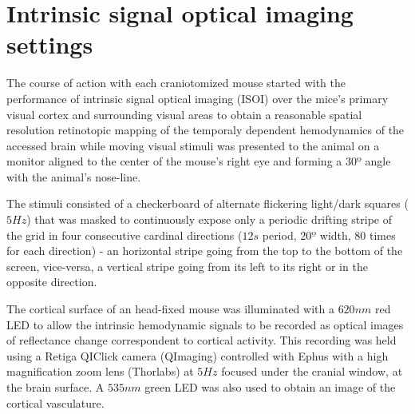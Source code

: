 \section{Intrinsic signal optical imaging settings}
\label{sec:Intrinsic-signal-optical-imaging-settings}

The course of action with each craniotomized mouse started with the performance of intrinsic signal optical imaging (ISOI) over the mice's primary visual cortex and surrounding visual areas to obtain a reasonable spatial resolution retinotopic mapping of the temporaly dependent hemodynamics of the accessed brain while moving visual stimuli was presented to the animal on a monitor aligned to the center of the mouse's right eye and forming a $30º$ angle with the animal's nose-line.

The stimuli consisted of a checkerboard of alternate flickering light/dark squares ($5 Hz$) that was masked to continuously expose only a periodic drifting stripe of the grid in four consecutive cardinal directions ($12 s$ period, $20º$ width, 80 times for each direction) - an horizontal stripe going from the top to the bottom of the screen, vice-versa, a vertical stripe going from its left to its right or in the opposite direction.

The cortical surface of an head-fixed mouse was illuminated with a $620 nm$ red LED to allow the intrinsic hemodynamic signals to be recorded as optical images of reflectance change correspondent to cortical activity. This recording was held using a Retiga QIClick camera (QImaging) controlled with Ephus with a high magnification zoom lens (Thorlabs) at $5 Hz$ focused under the cranial window, at the brain surface. A $535 nm$ green LED was also used to obtain an image of the cortical vasculature.


